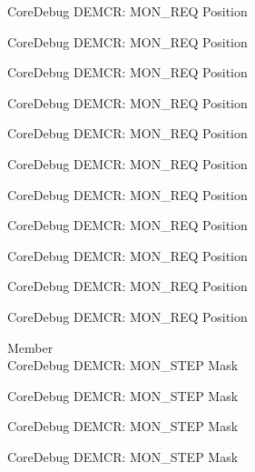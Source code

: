 \begin{DoxyRefList}
\label{deprecated__deprecated000191}%
%
Core\+Debug DEMCR\+: MON\+\_\+\+REQ Position 

\label{deprecated__deprecated000333}%
%
Core\+Debug DEMCR\+: MON\+\_\+\+REQ Position 

\label{deprecated__deprecated000409}%
%
Core\+Debug DEMCR\+: MON\+\_\+\+REQ Position 

\label{deprecated__deprecated000498}%
%
Core\+Debug DEMCR\+: MON\+\_\+\+REQ Position 

\label{deprecated__deprecated000600}%
%
Core\+Debug DEMCR\+: MON\+\_\+\+REQ Position 

\label{deprecated__deprecated000706}%
%
Core\+Debug DEMCR\+: MON\+\_\+\+REQ Position 

\label{deprecated__deprecated000850}%
%
Core\+Debug DEMCR\+: MON\+\_\+\+REQ Position 

\label{deprecated__deprecated000992}%
%
Core\+Debug DEMCR\+: MON\+\_\+\+REQ Position 

\label{deprecated__deprecated001068}%
%
Core\+Debug DEMCR\+: MON\+\_\+\+REQ Position 

\label{deprecated__deprecated001157}%
%
Core\+Debug DEMCR\+: MON\+\_\+\+REQ Position 

\label{deprecated__deprecated001259}%
%
Core\+Debug DEMCR\+: MON\+\_\+\+REQ Position  
\item[Member \doxylink{group___c_m_s_i_s___core_debug_ga2ded814556de96fc369de7ae9a7ceb98}{Core\+Debug\+\_\+\+DEMCR\+\_\+\+MON\+\_\+\+STEP\+\_\+\+Msk} ]\hfill \\
\label{deprecated__deprecated000050}%
%
Core\+Debug DEMCR\+: MON\+\_\+\+STEP Mask 

\label{deprecated__deprecated000194}%
%
Core\+Debug DEMCR\+: MON\+\_\+\+STEP Mask 

\label{deprecated__deprecated000336}%
%
Core\+Debug DEMCR\+: MON\+\_\+\+STEP Mask 

\label{deprecated__deprecated000412}%
%
Core\+Debug DEMCR\+: MON\+\_\+\+STEP Mask 


\end{DoxyRefList}
